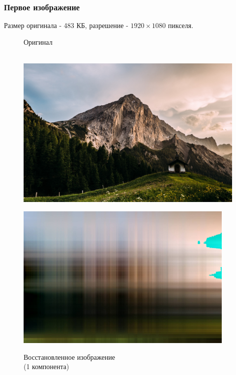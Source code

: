 \documentclass[a4paper]{article}
\begin{document}
\subsubsection{Первое изображение}
Размер оригинала - 483 КБ, разрешение - $1920\times 1080$ пикселя.
\begin{figure}[H]
\centering
    \begin{minipage}{.45\textwidth}
    \centering
    \caption{Оригинал\\$\,$}
    \includegraphics[width = .95\textwidth]{resources/Austria.jpg}
    \label{fig:aus}
    \end{minipage}%
    \begin{minipage}{.45\textwidth}
      \centering
    \caption{Восстановленное изображение \\(1 компонента)}
    \includegraphics[width = 0.95\textwidth]{reconstructions/with_1comps_Austria.jpg}
    \label{fig:aus_1}
    \end{minipage}%
\end{figure}
\end{document}
